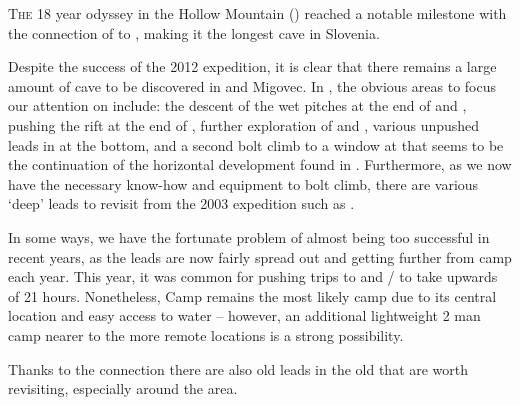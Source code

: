 \thispagestyle{endchapter}

\begin{tcolorbox}
\vspace{80pt}

\lettrine{T}{he} 18 year odyssey in the Hollow Mountain () reached a notable milestone with the connection of  to , making it the longest cave in Slovenia.

Despite the success of the 2012 expedition, it is clear that there
remains a large amount of cave to be discovered in  and
Migovec. In , the obvious areas to focus our attention
on include: the descent of the wet pitches at the end of  and , pushing the rift at the end of , further exploration of  and ,
various unpushed leads in  at the bottom, and a
second bolt climb to a window at  that seems to
be the continuation of the horizontal development found in .
Furthermore, as we now have the necessary know-how and equipment to bolt
climb, there are various `deep' leads to revisit from the 2003
expedition such as .

In some ways, we have the fortunate problem of almost being too
successful in recent years, as the leads are now fairly spread out and
getting further from camp each year. This year, it was common for
pushing trips to  and
/ to take upwards of 21 hours.
Nonetheless, Camp  remains the most likely camp due to its
central location and easy access to water -- however, an additional
lightweight 2 man camp nearer to the more remote locations is a strong
possibility.

Thanks to the connection there are also old leads in the old  that
are worth revisiting, especially around the  area.



\end{tcolorbox}
\BgThispage